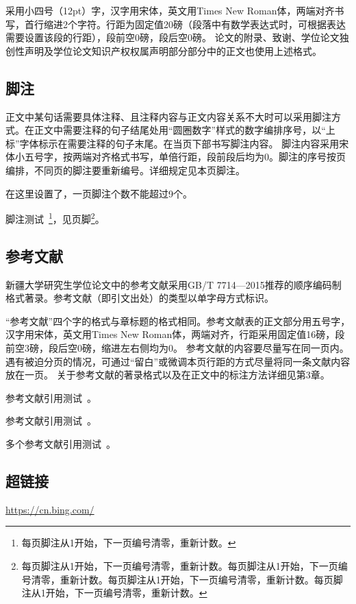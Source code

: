 采用小四号（12pt）字，汉字用宋体，英文用Times New Roman体，两端对齐书写，首行缩进2个字符。行距为固定值20磅（段落中有数学表达式时，可根据表达需要设置该段的行距），段前空0磅，段后空0磅。
论文的附录、致谢、学位论文独创性声明及学位论文知识产权权属声明部分部分中的正文也使用上述格式。

\subsection{脚注}

正文中某句话需要具体注释、且注释内容与正文内容关系不大时可以采用脚注方式。在正文中需要注释的句子结尾处用“圆圈数字”样式的数字编排序号，以“上标”字体标示在需要注释的句子末尾。在当页下部书写脚注内容。
脚注内容采用宋体小五号字，按两端对齐格式书写，单倍行距，段前段后均为0。脚注的序号按页编排，不同页的脚注要重新编号。详细规定见本页脚注。 

在这里设置了，一页脚注个数不能超过9个。

脚注测试~\footnote{每页脚注从1开始，下一页编号清零，重新计数。}，见页脚\footnote{每页脚注从1开始，下一页编号清零，重新计数。每页脚注从1开始，下一页编号清零，重新计数。每页脚注从1开始，下一页编号清零，重新计数。每页脚注从1开始，下一页编号清零，重新计数。}。

\subsection{参考文献}

新疆大学研究生学位论文中的参考文献采用GB/T 7714—2015推荐的顺序编码制格式著录。参考文献（即引文出处）的类型以单字母方式标识。

“参考文献”四个字的格式与章标题的格式相同。参考文献表的正文部分用五号字，汉字用宋体，英文用Times New Roman体，两端对齐，行距采用固定值16磅，段前空3磅，段后空0磅，缩进左右侧均为0。
参考文献的内容要尽量写在同一页内。遇有被迫分页的情况，可通过“留白”或微调本页行距的方式尽量将同一条文献内容放在一页。
关于参考文献的著录格式以及在正文中的标注方法详细见第3章。

参考文献引用测试~\cite{born1981}。

参考文献引用测试~\cite{knuth1984}。

多个参考文献引用测试~\cite{born1981,knuth1984}。


\subsection{超链接}

\url{https://cn.bing.com/}